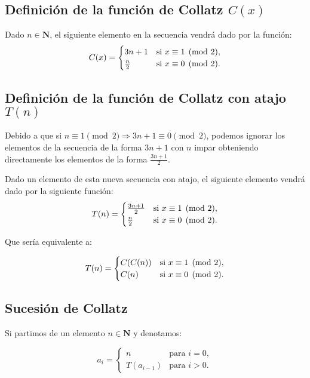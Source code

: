 \subsection{Definición de la función de Collatz $C(x)$}
Dado $n\in\mathbf{N}$, el siguiente elemento en la secuencia vendrá dado por la función:
\begin{equation}
\label{C(n)}
    C(x) = \begin{cases}
    3n+1 & \text{si \ensuremath{x\equiv1\pmod2}},\\
    \frac{n}{2} & \text{si \ensuremath{x\equiv0\pmod2}.}
    \end{cases}
\end{equation}




\subsection{Definición de la función de Collatz con atajo $T(n)$}
Debido a que si $n\equiv1\pmod2 \Longrightarrow 3n+1\equiv0\pmod2$, podemos ignorar los elementos de la secuencia de la forma $3n+1$ con $n$ impar obteniendo directamente los elementos de la forma $\frac{3n+1}{2}$. 

Dado un elemento de esta nueva secuencia con atajo, el siguiente elemento vendrá dado por la siguiente función:
\begin{equation}
\label{T(n)}
    T(n) = \begin{cases}
    \frac{3n+1}{2} & \text{si \ensuremath{x\equiv1\pmod2}},\\
    \frac{n}{2} & \text{si \ensuremath{x\equiv0\pmod2}.}
    \end{cases}
\end{equation}

Que sería equivalente a:

$$
    T(n) = \begin{cases}
    C(C(n)) & \text{si \ensuremath{x\equiv1\pmod2}},\\
    C(n) & \text{si \ensuremath{x\equiv0\pmod2}.}
    \end{cases}
$$

\subsection{Sucesión de Collatz}

Si partimos de un elemento $n \in \mathbf{N}$ y denotamos:

\begin{equation}
\label{SucesionCollatz}
    a_i = \begin{cases}
    n & \text{para } i=0,\\
    T(a_{i-1}) & \text{para } i>0.
    \end{cases}
\end{equation}

